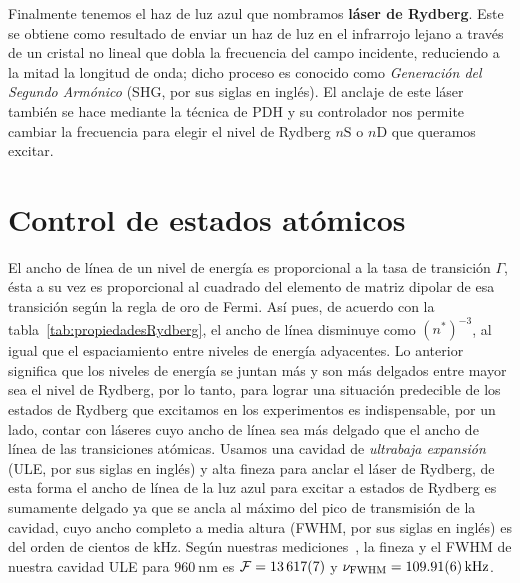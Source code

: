 \p Finalmente tenemos el haz de luz azul que nombramos \textbf{láser de Rydberg}. Este se obtiene como resultado de enviar un haz de luz en el infrarrojo lejano a través de un cristal no lineal que dobla la frecuencia del campo incidente, reduciendo a la mitad la longitud de onda; dicho proceso es conocido como \emph{Generación del Segundo Armónico} (SHG, por sus siglas en inglés). El anclaje de este láser también se hace mediante la técnica de PDH y su controlador nos permite cambiar la frecuencia para elegir el nivel de Rydberg $n\mathrm{S}$ o $n\mathrm{D}$ que queramos excitar.

\section{\label{sec:controlEstadosAtomicos}Control de estados atómicos}

El ancho de línea de un nivel de energía es proporcional a la tasa de transición $\Gamma$, ésta a su vez es proporcional al cuadrado del elemento de matriz dipolar de esa transición según la regla de oro de Fermi. Así pues, de acuerdo con la tabla~\ref{tab:propiedadesRydberg}, el ancho de línea disminuye como $(n^{*})^{-3}$, al igual que el espaciamiento entre niveles de energía adyacentes. Lo anterior significa que los niveles de energía se juntan más y son más delgados entre mayor sea el nivel de Rydberg, por lo tanto, para lograr una situación predecible de los estados de Rydberg que excitamos en los experimentos es indispensable, por un lado, contar con láseres cuyo ancho de línea sea más delgado que el ancho de línea de las transiciones atómicas. Usamos una cavidad de \emph{ultrabaja expansión} (ULE, por sus siglas en inglés) y alta fineza para anclar el láser de Rydberg, de esta forma el ancho de línea de la luz azul para excitar a estados de Rydberg es sumamente delgado ya que se ancla al máximo del pico de transmisión de la cavidad, cuyo ancho completo a media altura (FWHM, por sus siglas en inglés) es del orden de cientos de $\si{\kilo\hertz}$. Según nuestras mediciones~\cite{eduardo}, la fineza y el FWHM de nuestra cavidad ULE para $\SI{960}{\nano\meter}$ es $\mathcal{F}=\SI{13617\pm7}{}$ y $\nu_\sm{\mathrm{FWHM}}=\SI{109.91\pm0.06}{\kilo\hertz}$.



